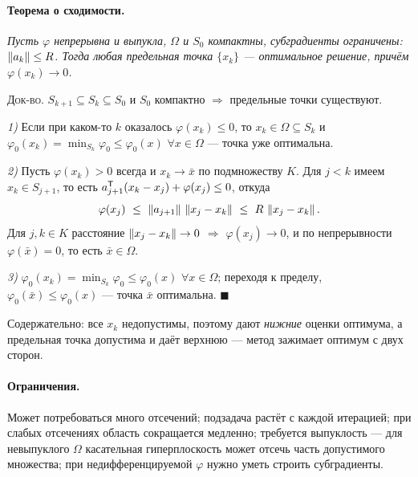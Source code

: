 \paragraph{Теорема о сходимости.}
\textit{Пусть $\varphi$ непрерывна и выпукла, $\Omega$ и $S_0$ компактны,
субградиенты ограничены: $\left\lVert a_k \right\rVert \le R$. Тогда любая предельная точка
$\{x_k\}$ — оптимальное решение, причём $\varphi(x_k) \to 0$.}

\textsc{Док-во.} $S_{k+1} \subseteq S_k \subseteq S_0$ и $S_0$ компактно
$\Rightarrow$ предельные точки существуют.

\emph{1)} Если при каком-то $k$ оказалось $\varphi(x_k) \le 0$, то
$x_k \in \Omega \subseteq S_k$ и $\varphi_0(x_k) = \min_{S_k}\varphi_0 \le
\varphi_0(x)$ $\forall x \in \Omega$ — точка уже оптимальна.

\emph{2)} Пусть $\varphi(x_k) > 0$ всегда и $x_k \to \bar{x}$ по подмножеству
$K$. Для $j < k$ имеем $x_k \in S_{j+1}$, то есть
$a_{j+1}^{\mathsf{T}}(x_k - x_j) + \varphi(x_j) \le 0$, откуда
\[
  \varphi(x_j) \ \le\ \norm{a_{j+1}}\,\norm{x_j - x_k}
   \ \le\ R\,\norm{x_j - x_k} .
\]
Для $j,k \in K$ расстояние $\left\lVert x_j - x_k \right\rVert \to 0$ $\Rightarrow$
$\varphi(x_j) \to 0$, и по непрерывности $\varphi(\bar{x}) = 0$, то есть
$\bar{x} \in \Omega$.

\emph{3)} $\varphi_0(x_k) = \min_{S_k}\varphi_0 \le \varphi_0(x)$
$\forall x \in \Omega$; переходя к пределу,
$\varphi_0(\bar{x}) \le \varphi_0(x)$ — точка $\bar{x}$ оптимальна.
$\blacksquare$

Содержательно: все $x_k$ недопустимы, поэтому дают \emph{нижние} оценки
оптимума, а предельная точка допустима и даёт верхнюю — метод зажимает оптимум
с двух сторон.

\paragraph{Ограничения.}
Может потребоваться много отсечений; подзадача растёт с каждой итерацией; при
слабых отсечениях область сокращается медленно; требуется выпуклость — для
невыпуклого $\Omega$ касательная гиперплоскость может отсечь часть допустимого
множества; при недифференцируемой $\varphi$ нужно уметь строить субградиенты.

